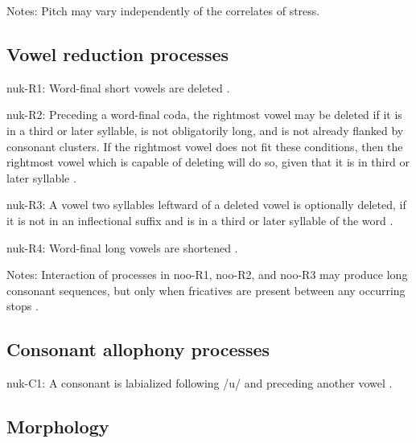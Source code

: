 {\begin{appendixdesc}
\item[Notes:] Pitch may vary independently of the correlates of stress.
\end{appendixdesc}
\subsection*{Vowel reduction processes}
\begin{appendixdesc}

\item[nuk-R1:] Word-final short vowels are deleted \citep[25]{Rose1981}.

\item[nuk-R2:] Preceding a word-final coda, the rightmost vowel may be deleted if it is in a third or later syllable, is not obligatorily long, and is not already flanked by consonant clusters. If the rightmost vowel does not fit these conditions, then the rightmost vowel which is capable of deleting will do so, given that it is in third or later syllable \citep[25]{Rose1981}.

\item[nuk-R3:] A vowel two syllables leftward of a deleted vowel is optionally deleted, if it is not in an inflectional suffix and is in a third or later syllable of the word \citep[25]{Rose1981}.

\item[nuk-R4:] Word-final long vowels are shortened \citep[27]{Rose1981}.

\item[Notes:] Interaction of processes in noo-R1, noo-R2, and noo-R3 may produce long consonant sequences, but only when fricatives are present between any occurring stops \citep[26]{Rose1981}.
\end{appendixdesc}
\subsection*{Consonant allophony processes}
\begin{appendixdesc}

\item[nuk-C1:] A consonant is labialized following /u/ and preceding another vowel \citep[27]{Stonham1999}.
\end{appendixdesc}
\subsection*{Morphology}

\begin{appendixdesc}


\end{appendixdesc}}
